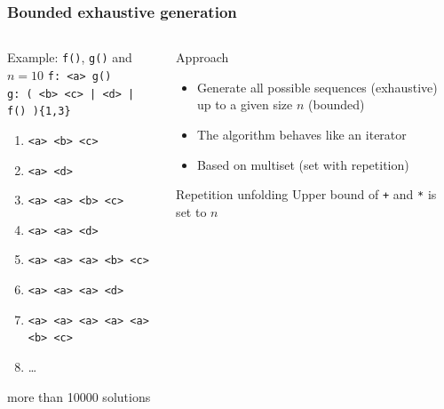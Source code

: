 \documentclass[9pt]{beamer}
\newcommand{\code}[1]{\texttt{#1}}
\begin{document}
\begin{frame}[t]
\frametitle{Bounded exhaustive generation}

\begin{columns}[t]

\begin{column}{.55\textwidth}
\begin{exampleblock}{Example: \code{f()}, \code{g()} and $n = 10$}
\code{f: <a> g()} \\
\code{g: ( <b> <c> | <d> | f() )\{1,3\}} \\

\begin{enumerate}
\onslide<+->
\item \code{<a> <b> <c>}
\onslide<+->
\item \code{<a> <d>}
\onslide<+->
\item \code{<a> <a> <b> <c>}
\onslide<+->
\item \code{<a> <a> <d>}
\onslide<+->
\item \code{<a> <a> <a> <b> <c>}
\onslide<+->
\item \code{<a> <a> <a> <d>}
\onslide<+->
\item \code{<a> <a> <a> <a> <a> <b> <c>}
\item …
\end{enumerate}
\onslide<+->
more than 10000 solutions
\end{exampleblock}
\end{column}

\begin{column}{.45\textwidth}
\begin{block}{Approach}
\begin{itemize}
\item Generate all possible sequences (exhaustive) up to a given size $n$
(bounded)
\item The algorithm behaves like an iterator
\item Based on multiset (set with repetition)
\end{itemize}
\end{block}

\begin{block}{Repetition unfolding}
Upper bound of \code{+} and \code{*} is set to $n$
\end{block}
\end{column}

\end{columns}

\end{frame}
\end{document}

